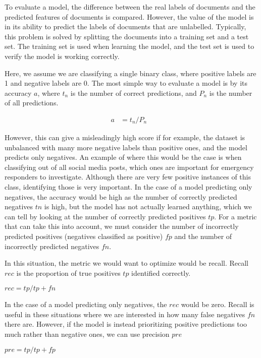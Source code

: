 To evaluate a model, the difference between the real labels of documents and the predicted features of documents is compared. However, the value of the model is in its ability to predict the labels of documents that are unlabelled. Typically, this problem is solved by splitting the documents into a training set and a test set. The training set is used when learning the model, and the test set is used to verify the model is working correctly. 

Here, we assume we are classifying a single binary class, where positive labels are 1 and negative labels are 0. The most simple way to evaluate a model is by its accuracy $a$, where ${t_n}$ is the number of correct predictions, and $P_n$ is the number of all predictions.

\begin{align*}
a &= t_n / P_n  &
\end{align*}

However, this can give a misleadingly high score if for example, the dataset is unbalanced with many more negative labels than positive ones, and the model predicts only negatives. An example of where this would be the case is when classifying out of all social media posts, which ones are important for emergency responders to investigate. Although there are very few positive instances of this class, identifying those is very important. In the case of a model predicting only negatives, the accuracy would be high as the number of correctly predicted negatives ${tn}$ is high, but the model has not actually learned anything, which we can tell by looking at the number of correctly predicted positives ${tp}$. For a metric that can take this into account, we must consider the number of incorrectly predicted positives (negatives classified as positive) ${fp}$ and the number of incorrectly predicted negatives ${fn}$.

In this situation, the metric we would want to optimize would be recall. Recall ${rec}$ is the proportion of true positives ${tp}$ identified correctly. 

${rec} = {tp} / {tp} + {fn}$

In the case of a model predicting only negatives, the ${rec}$ would be zero. Recall is useful in these situations where we are interested in how many false negatives ${fn}$ there are. However, if the model is instead prioritizing positive predictions too much rather than negative ones, we can use precision ${pre}$

${pre} = {tp} / {tp} + {fp}$



